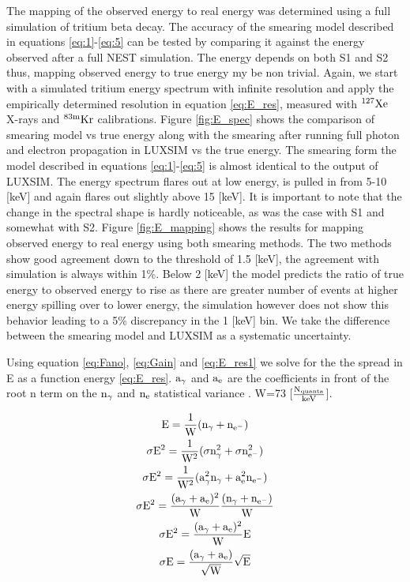 The mapping of the observed energy to real energy was determined using a full simulation of tritium beta decay. The accuracy of the smearing model described in equations \ref{eq:1}-\ref{eq:5} can be tested by comparing it against the energy observed after a full NEST simulation. The energy depends on both S1 and S2 thus, mapping observed energy to true energy my be non trivial. Again, we start with a simulated tritium energy spectrum with infinite resolution and apply the empirically determined resolution in equation \ref{eq:E_res}, measured with $\rm^{127}Xe$ X-rays and $\rm ^{83m}Kr$ calibrations. Figure \ref{fig:E_spec} shows the comparison of smearing model vs true energy along with the smearing after running full photon and electron propagation in LUXSIM vs the true energy. The smearing form the model described in equations \ref{eq:1}-\ref{eq:5} is almost identical to the output of LUXSIM. The energy spectrum flares out at low energy, is pulled in from 5-10 [keV] and again flares out slightly above 15 [keV]. It is important to note that the change in the spectral shape is hardly noticeable, as was the case with S1 and somewhat with S2. Figure \ref{fig:E_mapping} shows the results for mapping observed energy to real energy using both smearing methods. The two methods show good agreement down to the threshold of 1.5 [keV], the agreement with simulation is always within 1\%. Below 2 [keV] the model predicts the ratio of true energy to observed energy to rise as there are greater number of events at higher energy spilling over to lower energy, the simulation however does not show this behavior leading to a 5\% discrepancy in the 1 [keV] bin. We take the difference between the smearing model and LUXSIM as a systematic uncertainty. 

Using equation \ref{eq:Fano}, \ref{eq:Gain} and \ref{eq:E_res1} we solve for the the spread in E as a function energy \ref{eq:E_res}. $\rm a_\gamma$ and $\rm a_e$ are the coefficients in front of the root n term on the $\rm n_\gamma$ and $\rm n_e$ statistical variance . W=73 [$\rm \frac{N_{quanta}}{keV}$].

\begin{gather}
\label{eq:E_res1} \rm E= \frac{1}{W}(n_\gamma + n_{e^-}) \\
 \rm \sigma E^2= \frac{1}{W^2}(\sigma n_\gamma ^2 + \sigma n_{e^-} ^2)\\ 
 \rm \sigma E^2= \frac{1}{W^2}(a_\gamma^2 n_\gamma + a_e^2 n_{e^-})\\
 \rm \sigma E^2= \frac{(a_\gamma+a_e)^2}{W}\frac{(n_\gamma + n_{e^-})}{W}\\
 \rm \sigma E^2= \frac{(a_\gamma+a_e)^2}{W}E\\
  \rm \sigma E= \frac{(a_\gamma+a_e)}{\sqrt{W}}\sqrt{E}
\label{eq:E_res}
\end{gather}

